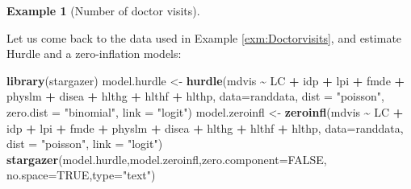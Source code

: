 \documentclass[
  12pt,
]{book}
\newenvironment{Shaded}{\begin{snugshade}}{\end{snugshade}}
\newcommand{\AttributeTok}[1]{\textcolor[rgb]{0.13,0.29,0.53}{#1}}
\newcommand{\ConstantTok}[1]{\textcolor[rgb]{0.56,0.35,0.01}{#1}}
\newcommand{\FunctionTok}[1]{\textcolor[rgb]{0.13,0.29,0.53}{\textbf{#1}}}
\newcommand{\NormalTok}[1]{#1}
\newcommand{\OtherTok}[1]{\textcolor[rgb]{0.56,0.35,0.01}{#1}}
\newcommand{\SpecialCharTok}[1]{\textcolor[rgb]{0.81,0.36,0.00}{\textbf{#1}}}
\newcommand{\StringTok}[1]{\textcolor[rgb]{0.31,0.60,0.02}{#1}}
\theoremstyle{definition}
\theoremstyle{definition}
\newtheorem{example}{Example}[chapter]
\theoremstyle{definition}
\theoremstyle{definition}
\theoremstyle{remark}
\begin{document}
\begin{example}[Number of doctor visits]
\protect\hypertarget{exm:Doctorvisits2}{}\label{exm:Doctorvisits2}

Let us come back to the data used in Example \ref{exm:Doctorvisits}, and estimate Hurdle and a zero-inflation models:

\begin{Shaded}
\begin{Highlighting}[]
\FunctionTok{library}\NormalTok{(stargazer)}
\NormalTok{model.hurdle }\OtherTok{\textless{}{-}} 
  \FunctionTok{hurdle}\NormalTok{(mdvis }\SpecialCharTok{\textasciitilde{}}\NormalTok{ LC }\SpecialCharTok{+}\NormalTok{ idp }\SpecialCharTok{+}\NormalTok{ lpi }\SpecialCharTok{+}\NormalTok{ fmde }\SpecialCharTok{+}\NormalTok{ physlm }\SpecialCharTok{+}\NormalTok{ disea }\SpecialCharTok{+}\NormalTok{ hlthg }\SpecialCharTok{+}\NormalTok{ hlthf }\SpecialCharTok{+} 
\NormalTok{           hlthp, }\AttributeTok{data=}\NormalTok{randdata,}
         \AttributeTok{dist =} \StringTok{"poisson"}\NormalTok{, }\AttributeTok{zero.dist =} \StringTok{"binomial"}\NormalTok{, }\AttributeTok{link =} \StringTok{"logit"}\NormalTok{)}
\NormalTok{model.zeroinfl }\OtherTok{\textless{}{-}} \FunctionTok{zeroinfl}\NormalTok{(mdvis }\SpecialCharTok{\textasciitilde{}}\NormalTok{ LC }\SpecialCharTok{+}\NormalTok{ idp }\SpecialCharTok{+}\NormalTok{ lpi }\SpecialCharTok{+}\NormalTok{ fmde }\SpecialCharTok{+}\NormalTok{ physlm }\SpecialCharTok{+}
\NormalTok{                             disea }\SpecialCharTok{+}\NormalTok{ hlthg }\SpecialCharTok{+}\NormalTok{ hlthf }\SpecialCharTok{+}\NormalTok{ hlthp, }\AttributeTok{data=}\NormalTok{randdata,}
                           \AttributeTok{dist =} \StringTok{"poisson"}\NormalTok{, }\AttributeTok{link =} \StringTok{"logit"}\NormalTok{)}
\FunctionTok{stargazer}\NormalTok{(model.hurdle,model.zeroinfl,}\AttributeTok{zero.component=}\ConstantTok{FALSE}\NormalTok{,}
          \AttributeTok{no.space=}\ConstantTok{TRUE}\NormalTok{,}\AttributeTok{type=}\StringTok{"text"}\NormalTok{)}
\end{Highlighting}
\end{Shaded}


\end{example}
\end{document}
